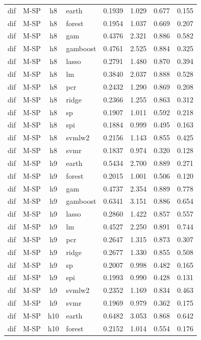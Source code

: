 \begin{ThreePartTable}
\begin{longtable}[t]{llclcccc}
\addlinespace
dif & M-SP & h8 & earth & 0.1939 & 1.029 & 0.677 & 0.155\\
dif & M-SP & h8 & forest & 0.1954 & 1.037 & 0.669 & 0.207\\
dif & M-SP & h8 & gam & 0.4376 & 2.321 & 0.886 & 0.582\\
dif & M-SP & h8 & gamboost & 0.4761 & 2.525 & 0.884 & 0.325\\
dif & M-SP & h8 & lasso & 0.2791 & 1.480 & 0.870 & 0.394\\
dif & M-SP & h8 & lm & 0.3840 & 2.037 & 0.888 & 0.528\\
dif & M-SP & h8 & pcr & 0.2432 & 1.290 & 0.869 & 0.208\\
dif & M-SP & h8 & ridge & 0.2366 & 1.255 & 0.863 & 0.312\\
dif & M-SP & h8 & sp & 0.1907 & 1.011 & 0.592 & 0.218\\
dif & M-SP & h8 & spi & 0.1884 & 0.999 & 0.495 & 0.163\\
dif & M-SP & h8 & svmlw2 & 0.2156 & 1.143 & 0.855 & 0.425\\
dif & M-SP & h8 & svmr & 0.1837 & 0.974 & 0.320 & 0.128\\
\addlinespace
dif & M-SP & h9 & earth & 0.5434 & 2.700 & 0.889 & 0.271\\
dif & M-SP & h9 & forest & 0.2015 & 1.001 & 0.506 & 0.120\\
dif & M-SP & h9 & gam & 0.4737 & 2.354 & 0.889 & 0.778\\
dif & M-SP & h9 & gamboost & 0.6341 & 3.151 & 0.886 & 0.654\\
dif & M-SP & h9 & lasso & 0.2860 & 1.422 & 0.857 & 0.557\\
dif & M-SP & h9 & lm & 0.4527 & 2.250 & 0.891 & 0.744\\
dif & M-SP & h9 & pcr & 0.2647 & 1.315 & 0.873 & 0.307\\
dif & M-SP & h9 & ridge & 0.2677 & 1.330 & 0.855 & 0.508\\
dif & M-SP & h9 & sp & 0.2007 & 0.998 & 0.482 & 0.165\\
dif & M-SP & h9 & spi & 0.1993 & 0.990 & 0.428 & 0.131\\
dif & M-SP & h9 & svmlw2 & 0.2352 & 1.169 & 0.834 & 0.463\\
dif & M-SP & h9 & svmr & 0.1969 & 0.979 & 0.362 & 0.175\\
\addlinespace
dif & M-SP & h10 & earth & 0.6482 & 3.053 & 0.868 & 0.642\\
dif & M-SP & h10 & forest & 0.2152 & 1.014 & 0.554 & 0.176\\

\end{longtable}
\end{ThreePartTable}
